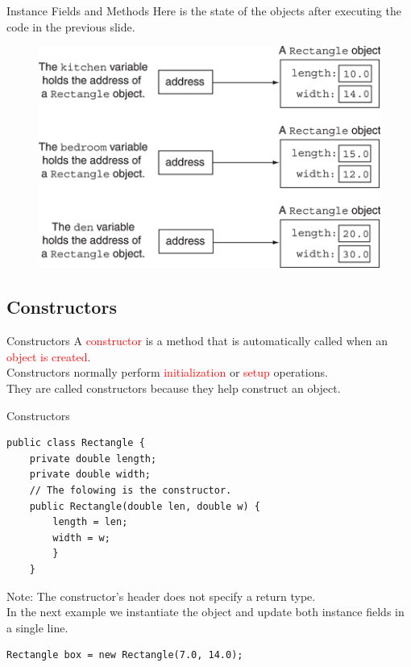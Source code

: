 \documentclass[11pt]{beamer}
\newcommand{\red}[1]{\textcolor{red}{#1}}
\begin{document}
\begin{frame}{Instance Fields and Methods}
    Here is the state of the objects after executing the code in the previous slide.
    \noindent 
    \begin{figure}[H]
    \centering
    \includegraphics[scale=0.9]{Images/chapter06_RectangleInstancesWithValues.png}
    \end{figure}
\end{frame}

\subsection{Constructors}
\begin{frame}{Constructors}
    A \red{constructor} is a method that is automatically called when an \red{object is created}. \\ \vspace{1em}
    Constructors normally perform \red{initialization} or \red{setup} operations. \\ \vspace{1em}
    They are called constructors because they help construct an object.
\end{frame}

\begin{frame}[fragile]{Constructors}
    \footnotesize
    \begin{lstlisting}
public class Rectangle {
    private double length;
    private double width;
    // The folowing is the constructor.
    public Rectangle(double len, double w) {
        length = len;
        width = w;
        }
    }
    \end{lstlisting}
    Note: The constructor's header does not specify a return type. \\ \vspace{1em}
    In the next example we instantiate the object and update both instance fields in a single line.
    \begin{lstlisting}
Rectangle box = new Rectangle(7.0, 14.0);
    \end{lstlisting}
\end{frame}
\end{document}
